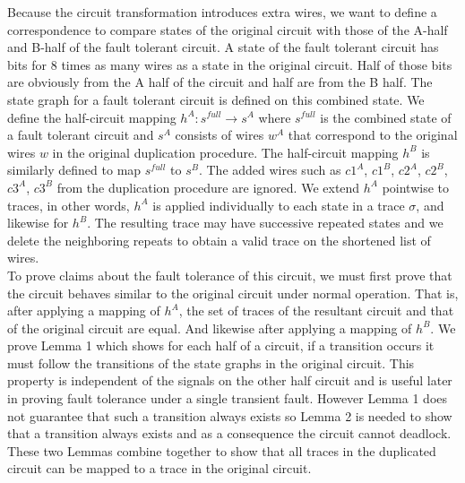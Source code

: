 \documentclass[12pt]{report}
\begin{document}
Because the circuit transformation introduces extra wires, we want to define a correspondence to compare states of the original circuit with those of the A-half and B-half of the fault tolerant circuit.  A state of the fault tolerant circuit has bits for 8 times as many wires as a state in the original circuit.  Half of those bits are obviously from the A half of the circuit and half are from the B half.  The state graph for a fault tolerant circuit is defined on this combined state.  We define the half-circuit mapping $h^A: s^{\mathit{full}} \to s^A$ where $s^{\mathit{full}}$ is the combined state of a fault tolerant circuit and $s^A$ consists of wires $w^A$ that correspond to the original wires $w$ in the original duplication procedure.  The half-circuit mapping $h^B$ is similarly defined to map $s^{\mathit{full}}$ to $s^B$.  The added wires such as $c1^A$, $c1^B$, $c2^A$, $c2^B$, $c3^A$, $c3^B$ from the duplication procedure are ignored.  We extend $h^A$ pointwise to traces, in other words, $h^A$ is applied individually to each state in a trace $\sigma$, and likewise for $h^B$.  %
The resulting trace may have successive repeated states and we delete the neighboring repeats to obtain a valid trace on the shortened list of wires.  %
\\

To prove claims about the fault tolerance of this circuit, we must first prove that the circuit behaves similar to the original circuit under normal operation.  That is, after applying a mapping of $h^A$, the set of traces of the resultant circuit and that of the original circuit are equal.  And likewise after applying a mapping of $h^B$.  We prove Lemma 1 which shows for each half of a circuit, if a transition occurs it must follow the transitions of the state graphs in the original circuit.  This property is independent of the signals on the other half circuit and is useful later in proving fault tolerance under a single transient fault.  %
However Lemma 1 does not guarantee that such a transition always exists so Lemma 2 is needed to show that a transition always exists and as a consequence the circuit cannot deadlock.  These two Lemmas combine together to show that all traces in the duplicated circuit can be mapped to a trace in the original circuit.\\%
\end{document}
